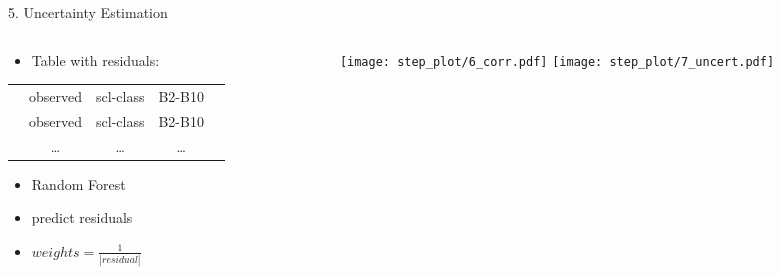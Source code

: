 \begin{frame}[t]{5. Uncertainty Estimation}
    \begin{columns}
        \begin{column}{0.45\textwidth}
            \begin{itemize}
                \item Table with residuals:
            \end{itemize}

            \scriptsize
            \begin{tabular}{| c |  c c c c |}
                \hline
                \color{myred}{residuals} & observed & scl-class & B2-B10 & \color{mygray}{weather} \\
                \color{myred}{residuals} & observed & scl-class & B2-B10 & \color{mygray}{weather} \\
                \color{myred}{\dots    } & \dots    & \dots     & \dots  & \color{mygray}{\dots}   \\
            \end{tabular}\normalsize \vspace{0.5cm}

            \begin{itemize}
                \item Random Forest
                \item predict residuals
                \item $weights = \frac{1}{|residual|}$
            \end{itemize}
        \end{column}
        \begin{column}{0.45\textwidth}
            \begin{figure}
                \vspace{-1.6cm}
                \texttt{[image: step\_plot/6\_corr.pdf]}
                \texttt{[image: step\_plot/7\_uncert.pdf]}
            \end{figure}
        \end{column}
    \end{columns}
\end{frame}

